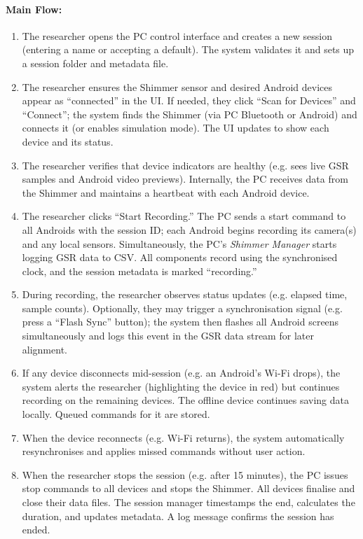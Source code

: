 \paragraph{Main Flow:}
\begin{enumerate}
    \item The researcher opens the PC control interface and creates a new session (entering a name or accepting a default). The system validates it and sets up a session folder and metadata file.
    \item The researcher ensures the Shimmer sensor and desired Android devices appear as “connected” in the UI. If needed, they click “Scan for Devices” and “Connect”; the system finds the Shimmer (via PC Bluetooth or Android) and connects it (or enables simulation mode). The UI updates to show each device and its status.
    \item The researcher verifies that device indicators are healthy (e.g. sees live GSR samples and Android video previews). Internally, the PC receives data from the Shimmer and maintains a heartbeat with each Android device.
    \item The researcher clicks “Start Recording.” The PC sends a start command to all Androids with the session ID; each Android begins recording its camera(s) and any local sensors. Simultaneously, the PC’s \textit{Shimmer Manager} starts logging GSR data to CSV. All components record using the synchronised clock, and the session metadata is marked “recording.”
    \item During recording, the researcher observes status updates (e.g. elapsed time, sample counts). Optionally, they may trigger a synchronisation signal (e.g. press a “Flash Sync” button); the system then flashes all Android screens simultaneously and logs this event in the GSR data stream for later alignment.
    \item If any device disconnects mid-session (e.g. an Android’s Wi-Fi drops), the system alerts the researcher (highlighting the device in red) but continues recording on the remaining devices. The offline device continues saving data locally. Queued commands for it are stored.
    \item When the device reconnects (e.g. Wi-Fi returns), the system automatically resynchronises and applies missed commands without user action.
    \item When the researcher stops the session (e.g. after 15 minutes), the PC issues stop commands to all devices and stops the Shimmer. All devices finalise and close their data files. The session manager timestamps the end, calculates the duration, and updates metadata. A log message confirms the session has ended.

\end{enumerate}

